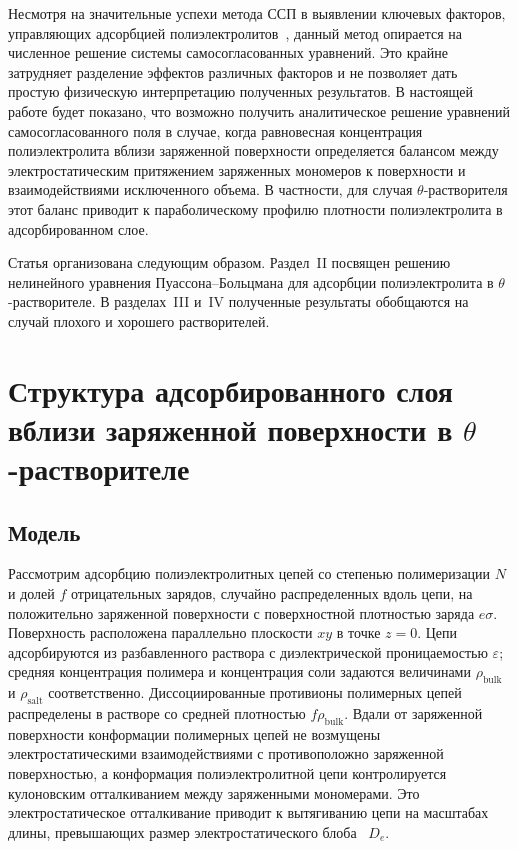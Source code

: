 \documentclass[12pt,a4paper]{article}
\begin{document}
Несмотря на значительные успехи метода ССП в выявлении ключевых факторов, управляющих адсорбцией полиэлектролитов~\cite{Fleer1993}, данный метод опирается на численное решение системы самосогласованных уравнений. Это крайне затрудняет разделение эффектов различных факторов и не позволяет дать простую физическую интерпретацию полученных результатов. В настоящей работе будет показано, что возможно получить аналитическое решение уравнений самосогласованного поля в случае, когда равновесная концентрация полиэлектролита вблизи заряженной поверхности определяется балансом между электростатическим притяжением заряженных мономеров к поверхности и взаимодействиями исключенного объема. В частности, для случая $\theta$-растворителя этот баланс приводит к параболическому профилю плотности полиэлектролита в адсорбированном слое. 

Статья организована следующим образом. Раздел~II посвящен решению нелинейного уравнения Пуассона--Больцмана для адсорбции полиэлектролита в $\theta$-растворителе. В разделах~III и~IV полученные результаты обобщаются на случай плохого и хорошего растворителей.

\section{Структура адсорбированного слоя вблизи заряженной поверхности в $\theta$-растворителе}

\subsection{Модель}

Рассмотрим адсорбцию полиэлектролитных цепей со степенью полимеризации $N$ и долей $f$ отрицательных зарядов, случайно распределенных вдоль цепи, на положительно заряженной поверхности с поверхностной плотностью заряда $e\sigma$. Поверхность расположена параллельно плоскости $xy$ в точке $z = 0$. Цепи адсорбируются из разбавленного раствора с диэлектрической проницаемостью $\varepsilon$; средняя концентрация полимера и концентрация соли задаются величинами $\rho_{\text{bulk}}$ и $\rho_{\text{salt}}$ соответственно. Диссоциированные противионы полимерных цепей распределены в растворе со средней плотностью $f\rho_{\text{bulk}}$. Вдали от заряженной поверхности конформации полимерных цепей не возмущены электростатическими взаимодействиями с противоположно заряженной поверхностью, а конформация полиэлектролитной цепи контролируется кулоновским отталкиванием между заряженными мономерами. Это электростатическое отталкивание приводит к вытягиванию цепи на масштабах длины, превышающих размер электростатического блоба~\cite{deGennes1979, Dobrynin1995} $D_e$. 
\end{document}
